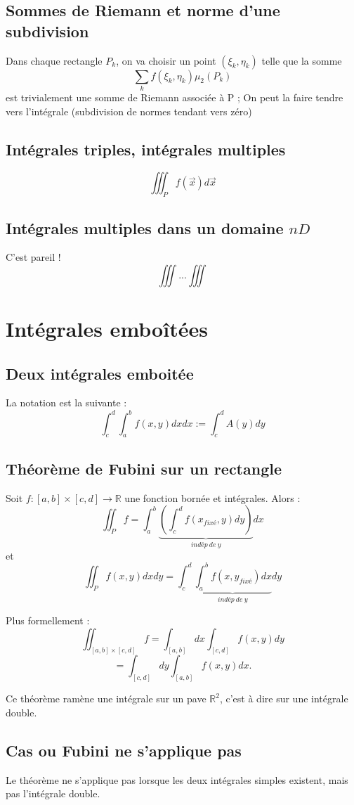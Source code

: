 \documentclass[11pt, a4paper, openany]{book}
\begin{document}
\subsection{Sommes de Riemann et norme d'une subdivision}
Dans chaque rectangle $P_k$, on va choisir un point $(\xi_k, \eta_k)$ telle que la somme
$$\sum_k f(\xi_k, \eta_k)\mu_2(P_k)$$
est trivialement une somme de Riemann associée à P ; On peut la faire tendre vers l'intégrale (subdivision de normes tendant vers zéro)

\subsection{Intégrales triples, intégrales multiples}
$$\iiint_P f(\vec{x})d\vec{x}$$

\subsection{Intégrales multiples dans un domaine $nD$}
C'est pareil !
$$\iiint...\iiint$$ 

\section{Intégrales emboîtées}
\subsection{Deux intégrales emboitée}
La notation est la suivante : 
$$\int_c^d \int_a^b f(x, y) dx dx := \int_c^d A(y) dy$$

\subsection{Théorème de Fubini sur un rectangle}
Soit $f : [a,b] \times [c,d] \rightarrow \mathbb{R}$ une fonction bornée et intégrales. Alors :
$$\iint_P f = \int_a^b\underbrace{\left(\int_c^d f(x_{fixé}, y) dy\right)}_{indép\ de\ y}dx$$
et
$$\iint_P f(x,y) dxdy = \int_c^d\underbrace{\int_a^b f(x, y_{fixé}) dx}_{indép\ de\ y}dy$$

Plus formellement : 
$$\iint_{[a,b] \times [c,d]} f = \int_{[a,b]} dx \int_{[c,d]} f(x,y) dy$$
$$= \int_{[c,d]} dy \int_{[a,b]} f(x,y) dx.$$

Ce théorème ramène une intégrale sur un pave $\mathbb{R}^2$, c'est à dire sur une intégrale double.

\subsection{Cas ou Fubini ne s'applique pas}
Le théorème ne s'applique pas lorsque les deux intégrales simples existent, mais pas l'intégrale double.\\
\end{document}
